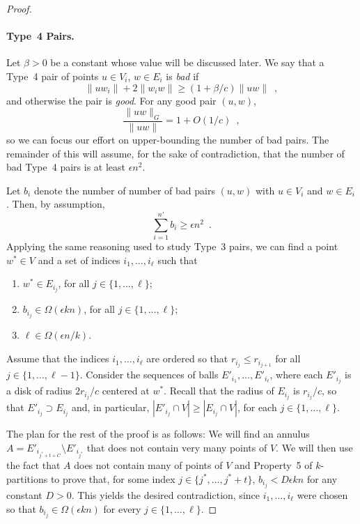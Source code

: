 \documentclass{patmorin}
\begin{document}
\begin{proof}
  \paragraph{Type~4 Pairs.}  
  Let $\beta > 0$ be a constant whose value will be discussed later.
  We say that a Type~4 pair of points $u\in V_i$, $w\in E_i$ is
  \emph{bad} if
  \[
      \|uw_i\|+2\|w_iw\| \ge (1+\beta/c)\|uw\| \enspace ,
  \]
  and otherwise the pair is \emph{good}.
  For any good pair $(u,w)$,
  \[
    \frac{\|uw\|_G}{\|uw\|} = 1+O(1/c) \enspace ,
  \]
  so we can focus our effort on upper-bounding the number of bad pairs.
  The remainder of this will assume, for the sake of contradiction,
  that the number of bad Type~4 pairs is at least $\epsilon n^2$.

  Let $b_i$ denote the number of number of bad pairs $(u,w)$ with
  $u\in V_i$ and $w\in E_i$.  Then, by assumption,
  \[
    \sum_{i=1}^{n'} b_i \ge \epsilon n^2 \enspace .
  \]
  Applying the same reasoning used to study Type~3 pairs, we can find a
  point $w^*\in V$ and a set of indices $i_1,\ldots,i_{\ell}$ such that
  \begin{enumerate}
    \item $w^*\in E_{i_j}$, for all $j\in\{1,\ldots,\ell\}$;
    \item $b_{i_j} \in \Omega(\epsilon kn)$, for all $j\in\{1,\ldots,\ell\}$;
    \item $\ell\in \Omega(\epsilon n/k)$.
  \end{enumerate}

  Assume that the indices $i_1,\ldots,i_\ell$ are ordered so that
  $r_{i_j}\le r_{i_{j+1}}$ for all $j\in\{1,\ldots,\ell-1\}$.  Consider
  the sequences of balls $E'_{i_1},\ldots,E'_{i_\ell}$, where each
  $E'_{i_j}$ is a disk of radius $2r_{i_j}/c$ centered at $w^*$. Recall
  that the radius of $E_{i_j}$ is $r_{i_j}/c$, so that $E'_{i_j}\supset
  E_{i_j}$ and, in particular, $|E'_{i_j}\cap V|\ge |E_{i_j}\cap V|$,
  for each $j\in\{1,\ldots,\ell\}$.

  The plan for the rest of the proof is as follows:  We will find an
  annulus $A=E'_{i_{j^*+t+C}}\setminus E'_{i_{j^*}}$ that does not contain
  very many points of $V$.  We will then use the fact that $A$ does not
  contain many of points of $V$ and Property~5 of $k$-partitions to prove
  that, for some index $j\in\{j^*,\ldots,j^*+t\}$, $b_{i_j}< D\epsilon kn$
  for any constant $D>0$.  This yields the desired contradiction, since
  $i_1,\ldots,i_\ell$ were chosen so that $b_{i_j}\in\Omega(\epsilon k n)$
  for every $j\in\{1,\ldots,\ell\}$.


\end{proof}
\end{document}
